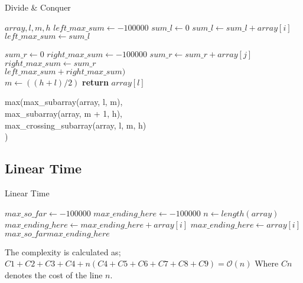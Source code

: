 \documentclass[twocolumns]{IEEEtran}
\begin{document}
\begin{algorithm}
	\caption{Divide \& Conquer}
	\begin{algorithmic}[1]
		
	 {$array, l, m, h$}
	\State$left\_max\_sum \leftarrow -100000$
	\State$sum\_l \leftarrow 0$
		\State$sum\_l \leftarrow sum\_l + array[i]$
			\State $left\_max\_sum \leftarrow sum\_l$
		\EndIf
	\EndFor
	
	\State $sum\_r \leftarrow 0$
	\State $right\_max\_sum \leftarrow -100000$
		\State$sum\_r \leftarrow sum\_r + array[j]$
			\State $right\_max\_sum \leftarrow sum\_r$
		\EndIf
	\EndFor\\
	\Return$left\_max\_sum + right\_max\_sum )$
	\EndFunction
	\\
		\State $m \leftarrow ((h + l) / 2)$
			\State \textbf{return} $array[l]$
		\EndIf
		
		\Return max(max\_subarray(array, l, m),\\
		max\_subarray(array, m + 1, h),\\
		max\_crossing\_subarray(array, l, m, h)\\
		)

	\EndFunction
	\end{algorithmic}
\end{algorithm}

\newpage
\subsection{Linear Time}
\begin{algorithm}
	\caption{Linear Time}
	\begin{algorithmic}[1]
	\State$max\_so\_far \leftarrow -100000$ \Comment{$1$}
	\State$max\_ending\_here \leftarrow -100000$ \Comment{$1$}
	\State$n \leftarrow length(array)$ \Comment{$1$}
		  \Comment{$n + 1$}
			\State$max\_ending\_here \leftarrow max\_ending\_here + array[i]$ \Comment{$n$}
			\Comment{$n$} 
					\State$max\_ending\_here \leftarrow array[i]$\Comment{$n$}
			\EndIf
			 \Comment{$n$}
				\State$max\_so\_far max\_ending\_here$ \Comment{$n$}
			\EndIf

		\EndFor
	\end{algorithmic}
\end{algorithm}
The complexity is calculated as;\\
$ C1 + C2 +C3 + C4 + n(C4 + C5 + C6 + C7 + C8 + C9) = \mathcal{O}(n) $
Where $Cn$ denotes the cost of the line $n$.
\end{document}
